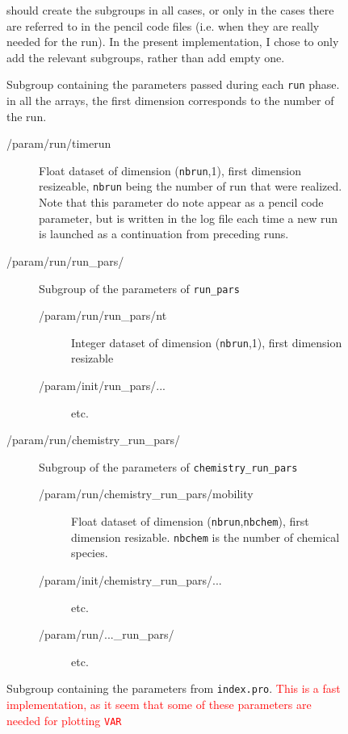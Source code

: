 \documentclass[a4paper,12pt]{article}
\newcommand{\note}[1]{\textcolor{red}{#1}}
\begin{document}
\begin{figure}[p]
{\begin{description}
\begin{description}
\begin{description}
\begin{description}
{        should create the subgroups in all cases, or only in the cases
        there are referred to in the pencil code files (i.e. when they
        are really needed for the run). In the present implementation,
        I chose to only add the relevant subgroups, rather than add
        empty one.}
      \end{description}
    \item[/param/run/] Subgroup containing the parameters
      passed during each \texttt{run} phase. in all the arrays, the
      first dimension corresponds to the number of the run.
      \begin{description}
      \item[/param/run/timerun] Float dataset of
        dimension (\texttt{nbrun},1), first dimension resizeable, \texttt{nbrun} being
        the number of run that were realized. Note that this
        parameter do note appear as a pencil code parameter, but is
        written in the log file each time a new run is launched as a
        continuation from preceding runs.
      \item[/param/run/run\_pars/] Subgroup of the parameters of
        \texttt{run\_pars} 
        \begin{description}
        \item[/param/run/run\_pars/nt] Integer dataset of
            dimension (\texttt{nbrun},1), first dimension resizable
        \item[/param/init/run\_pars/...] etc.
        \end{description}
      \item[/param/run/chemistry\_run\_pars/] Subgroup of the
        parameters of \texttt{chemistry\_run\_pars} 
        \begin{description}
        \item[/param/run/chemistry\_run\_pars/mobility] Float dataset of
            dimension (\texttt{nbrun},\texttt{nbchem}), first
            dimension resizable. \texttt{nbchem} is the number of
            chemical species.
        \item[/param/init/chemistry\_run\_pars/...] etc.
      \item[/param/run/...\_run\_pars/] etc.
        \end{description}
      \end{description}
      \item[/param/index/] Subgroup containing the parameters from
        \texttt{index.pro}. \note{This is a fast implementation, as it seem that
        some of these parameters are needed for plotting \texttt{VAR}
}
\end{description}
\end{description}
\end{description}}
\end{figure}
\end{document}
